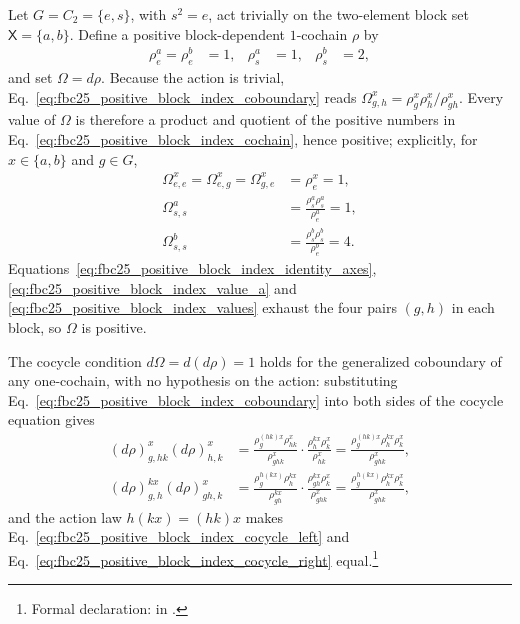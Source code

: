\documentclass{article}
\begin{document}
Let $G=C_2=\{e,s\}$, with $s^2=e$, act trivially on the two-element block set
$\mathsf X=\{a,b\}$. Define a positive block-dependent $1$-cochain $\rho$ by
\begin{align}
    \rho^a_e=\rho^b_e&=1,
    &\rho^a_s&=1,
    &\rho^b_s&=2,
    \label{eq:fbc25_positive_block_index_cochain}
\end{align}
and set $\Omega=d\rho$. Because the action is trivial,
Eq.~\ref{eq:fbc25_positive_block_index_coboundary} reads
$\Omega^x_{g,h}=\rho^x_g\rho^x_h/\rho^x_{gh}$. Every value of $\Omega$ is
therefore a product and quotient of the positive numbers in
Eq.~\ref{eq:fbc25_positive_block_index_cochain}, hence positive; explicitly,
for $x\in\{a,b\}$ and $g\in G$,
\begin{align}
    \Omega^x_{e,e}=\Omega^x_{e,g}=\Omega^x_{g,e}
        &=\rho^x_e=1,
    \label{eq:fbc25_positive_block_index_identity_axes}\\
    \Omega^a_{s,s}
        &=\frac{\rho^a_s\rho^a_s}{\rho^a_e}=1,
    \label{eq:fbc25_positive_block_index_value_a}\\
    \Omega^b_{s,s}
        &=\frac{\rho^b_s\rho^b_s}{\rho^b_e}=4.
    \label{eq:fbc25_positive_block_index_values}
\end{align}
Equations~\ref{eq:fbc25_positive_block_index_identity_axes},
\ref{eq:fbc25_positive_block_index_value_a} and
\ref{eq:fbc25_positive_block_index_values} exhaust the four pairs $(g,h)$ in
each block, so $\Omega$ is positive.

The cocycle condition $d\Omega=d(d\rho)=1$ holds for the generalized
coboundary of any one-cochain, with no hypothesis on the action: substituting
Eq.~\ref{eq:fbc25_positive_block_index_coboundary} into both sides of the
cocycle equation gives
\begin{align}
    (d\rho)^x_{g,hk}(d\rho)^x_{h,k}
        &=\frac{\rho^{(hk)x}_g\rho^x_{hk}}{\rho^x_{ghk}}
          \cdot\frac{\rho^{k x}_h\rho^x_k}{\rho^x_{hk}}
        =\frac{\rho^{(hk)x}_g\rho^{k x}_h\rho^x_k}{\rho^x_{ghk}},
    \label{eq:fbc25_positive_block_index_cocycle_left}\\
    (d\rho)^{k x}_{g,h}(d\rho)^x_{gh,k}
        &=\frac{\rho^{h(k x)}_g\rho^{k x}_h}{\rho^{k x}_{gh}}
          \cdot\frac{\rho^{k x}_{gh}\rho^x_k}{\rho^x_{ghk}}
        =\frac{\rho^{h(k x)}_g\rho^{k x}_h\rho^x_k}{\rho^x_{ghk}},
    \label{eq:fbc25_positive_block_index_cocycle_right}
\end{align}
and the action law $h(k x)=(hk)x$ makes
Eq.~\ref{eq:fbc25_positive_block_index_cocycle_left} and
Eq.~\ref{eq:fbc25_positive_block_index_cocycle_right} equal.\footnote{Formal
declaration:
 in
.}
\end{document}
